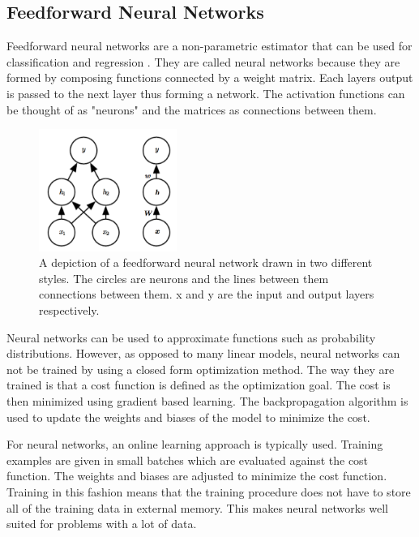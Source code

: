 
\subsection{Feedforward Neural Networks}

Feedforward neural networks are a non-parametric estimator that can be used for classification and regression \cite{alpaydin}. They are called neural networks because they are formed by composing functions connected by a weight matrix. Each layers output is passed to the next layer thus forming a network. The activation functions can be thought of as "neurons" and the matrices as connections between them.

\begin{figure}[H]
\centering
\includegraphics[width=0.4\textwidth]{images/nnet.png}
\caption{
  A depiction of a feedforward neural network drawn in two different styles. The circles are neurons and the lines between them connections between them. x and y are the input and output layers respectively. \cite{deep-learning-book}
}
\label{fig:nnet}
\end{figure}

Neural networks can be used to approximate functions such as probability distributions. However, as opposed to many linear models, neural networks can not be trained by using a closed form optimization method. The way they are trained is that a cost function is defined as the optimization goal. The cost is then minimized using gradient based learning. The backpropagation algorithm is used to update the weights and biases of the model to minimize the cost.

For neural networks, an online learning approach is typically used. Training examples are given in small batches which are evaluated against the cost function. The weights and biases are adjusted to minimize the cost function. Training in this fashion means that the training procedure does not have to store all of the training data in external memory. This makes neural networks well suited for problems with a lot of data.

